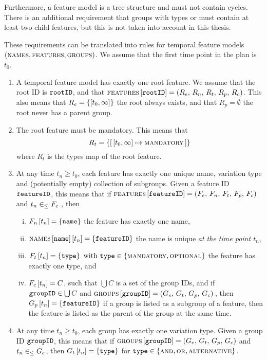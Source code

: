 Furthermore, a feature model is a tree structure and must not contain cycles. There is an additional requirement that groups with types \xortype{} or \ortype{} must contain at least two child features, but this is not taken into account in this thesis.

These requirements can be translated into rules for temporal feature models $(\textsc{names}, \textsc{features}, \textsc{groups}{})$. We assume that the first time point in the plan is $t_0$.

\begin{enumerate}[\itbf{WF\arabic*}, itemsep=0mm]
   \item A temporal feature model has exactly one root feature. We assume that the root ID is $\texttt{rootID}$, and that $\textsc{features} \left[ \texttt{rootID} \right] = \left(R_e,\, R_n,\, R_t,\, R_p,\, R_c\right)$. This also means that $R_e=\set{\interval{t_0}{\forever}}$ \textemdash{} the root always exists, and that $R_p = \emptyset$ \textemdash{} the root never has a parent group.
\item The root feature must be mandatory. This means that $$R_t  = \set{\intervalmapping{t_0}{\forever}{\mandatory}}$$ where $R_t$ is the types map of the root feature. 
\item At any time $t_n \geq t_0$, each feature has exactly one unique name, variation type and (potentially empty) collection of subgroups. Given a feature ID $\texttt{featureID}$, this means that if $\textsc{features} \left[ \texttt{featureID} \right] = \left(F_e,\, F_n,\, F_t,\, F_p,\, F_c\right)$ and $t_n \in_\leq F_e$ , then
   \begin{enumerate}[(i)]
      \item $F_n \left[ t_n \right] = \left\{\texttt{name}\right\}$ \textemdash{} the feature has exactly one name,
      \item $\textsc{names} \left[ \texttt{name} \right] \left[ t_n \right] = \left\{\texttt{featureID}\right\}$ \textemdash{} the name is unique \emph{at the time point $t_n$},
      \item $F_t \left[ t_n \right] = \left\{\texttt{type}\right\} \text{ with } \texttt{type} \in \left\{\textsc{mandatory}, \textsc{optional}\right\}$ \textemdash{} the feature has exactly one type, and
      \item $F_c \left[ t_n \right] = C$, such that $\bigcup C$ is a set of the group IDs, and if $\texttt{groupID} \in \bigcup C$ and $\textsc{groups}{} \left[ \texttt{groupID} \right] = \left(G_e,\, G_t,\, G_p,\, G_c\right){}$, then $G_p \left[ t_n \right] = \left\{\texttt{featureID}\right\}$ \textemdash{} if a group is listed as a subgroup of a feature, then the feature is listed as the parent of the group at the same time.
   \end{enumerate}
   \item At any time $t_n \geq t_0$, each group has exactly one variation type. Given a group ID $\texttt{groupID}$, this means that if $\textsc{groups}{} \left[ \texttt{groupID} \right] = \left(G_e,\, G_t,\, G_p,\, G_c\right)$ and $t_n \in_\leq G_e$, then $G_t \left[ t_n \right] = \left\{\texttt{type}\right\}$ for $\texttt{type} \in \left\{\textsc{and}, \textsc{or}, \textsc{alternative}\right\}$.

\end{enumerate}

